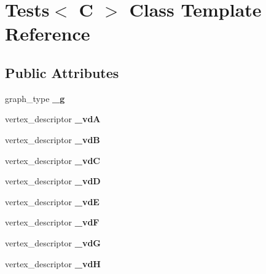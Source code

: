 \hypertarget{classTests}{\section{\-Tests$<$ \-C $>$ \-Class \-Template \-Reference}
\label{classTests}
}
\subsection*{\-Public \-Attributes}
\begin{DoxyCompactItemize}
\item 
\hypertarget{classTests_a861058c07274761c4b595975be7abcf9}{graph\-\_\-type {\bfseries \-\_\-g}}\label{classTests_a861058c07274761c4b595975be7abcf9}

\item 
\hypertarget{classTests_a5d0e4bd53b4e631a5e225f2fae955858}{vertex\-\_\-descriptor {\bfseries \-\_\-vd\-A}}\label{classTests_a5d0e4bd53b4e631a5e225f2fae955858}

\item 
\hypertarget{classTests_a427459487572ea12cf1cce8d55c9b925}{vertex\-\_\-descriptor {\bfseries \-\_\-vd\-B}}\label{classTests_a427459487572ea12cf1cce8d55c9b925}

\item 
\hypertarget{classTests_ab1cd3df6915aedd28725a4f5aad64c32}{vertex\-\_\-descriptor {\bfseries \-\_\-vd\-C}}\label{classTests_ab1cd3df6915aedd28725a4f5aad64c32}

\item 
\hypertarget{classTests_a8bbf0ab4a3f0520f4cc54ee13f8d5c40}{vertex\-\_\-descriptor {\bfseries \-\_\-vd\-D}}\label{classTests_a8bbf0ab4a3f0520f4cc54ee13f8d5c40}

\item 
\hypertarget{classTests_ae4fe12f69a86016b6b013fba54e4ea04}{vertex\-\_\-descriptor {\bfseries \-\_\-vd\-E}}\label{classTests_ae4fe12f69a86016b6b013fba54e4ea04}

\item 
\hypertarget{classTests_a96705b608ca156e7256276f61bd88424}{vertex\-\_\-descriptor {\bfseries \-\_\-vd\-F}}\label{classTests_a96705b608ca156e7256276f61bd88424}

\item 
\hypertarget{classTests_a35bfd964ac3cb67f6125299b8a3f64b0}{vertex\-\_\-descriptor {\bfseries \-\_\-vd\-G}}\label{classTests_a35bfd964ac3cb67f6125299b8a3f64b0}

\item 
\hypertarget{classTests_a61f597f3da7586d9908178a4903d3ab7}{vertex\-\_\-descriptor {\bfseries \-\_\-vd\-H}}\label{classTests_a61f597f3da7586d9908178a4903d3ab7}


\end{DoxyCompactItemize}
